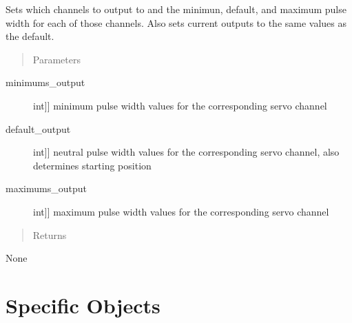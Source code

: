 \documentclass[letterpaper,10pt,english]{sphinxmanual}
\begin{document}
\begin{fulllineitems}
\begin{fulllineitems}
\end{fulllineitems}


\begin{fulllineitems}
\label{\detokenize{generic:AnalogMixerOutput.AnalogMixerOutput.set_outputs}}
\sphinxAtStartPar
Sets which channels to output to and the minimun, default, and maximum pulse width for each of those channels.
Also sets current outputs to the same values as the default.
\begin{quote}\begin{description}
\item[{Parameters}] \leavevmode
\end{description}\end{quote}
\begin{description}
\item[{minimums\_output}] \leavevmode{[}{[}int{]}{]}
\sphinxAtStartPar
minimum pulse width values for the corresponding servo channel

\item[{default\_output}] \leavevmode{[}{[}int{]}{]}
\sphinxAtStartPar
neutral pulse width values for the corresponding servo channel, also determines starting position

\item[{maximums\_output}] \leavevmode{[}{[}int{]}{]}
\sphinxAtStartPar
maximum pulse width values for the corresponding servo channel

\end{description}
\begin{quote}\begin{description}
\item[{Returns}] \leavevmode
\end{description}\end{quote}

\sphinxAtStartPar
None

\end{fulllineitems}


\end{fulllineitems}



\section{Specific Objects}
\label{\detokenize{specific:specific-objects}}\label{\detokenize{specific::doc}}
\end{document}

